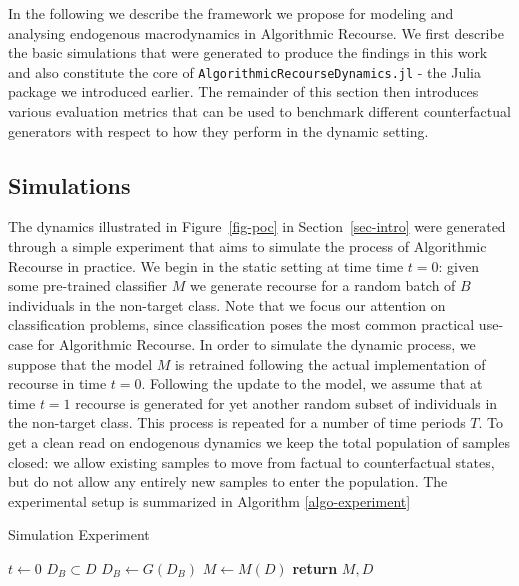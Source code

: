 \documentclass[
  conference]{IEEEtran}
\begin{document}
In the following we describe the framework we propose for modeling and
analysing endogenous macrodynamics in Algorithmic Recourse. We first
describe the basic simulations that were generated to produce the
findings in this work and also constitute the core of
\texttt{AlgorithmicRecourseDynamics.jl} - the Julia package we
introduced earlier. The remainder of this section then introduces
various evaluation metrics that can be used to benchmark different
counterfactual generators with respect to how they perform in the
dynamic setting.

\hypertarget{sec-method-2-experiment}{%
\subsection{Simulations}\label{sec-method-2-experiment}}

The dynamics illustrated in Figure~\ref{fig-poc} in
Section~\ref{sec-intro} were generated through a simple experiment that
aims to simulate the process of Algorithmic Recourse in practice. We
begin in the static setting at time time \(t=0\): given some pre-trained
classifier \(M\) we generate recourse for a random batch of \(B\)
individuals in the non-target class. Note that we focus our attention on
classification problems, since classification poses the most common
practical use-case for Algorithmic Recourse. In order to simulate the
dynamic process, we suppose that the model \(M\) is retrained following
the actual implementation of recourse in time \(t=0\). Following the
update to the model, we assume that at time \(t=1\) recourse is
generated for yet another random subset of individuals in the non-target
class. This process is repeated for a number of time periods \(T\). To
get a clean read on endogenous dynamics we keep the total population of
samples closed: we allow existing samples to move from factual to
counterfactual states, but do not allow any entirely new samples to
enter the population. The experimental setup is summarized in Algorithm
\ref{algo-experiment}

\begin{algorithm}
\caption{Simulation Experiment}\label{algo-experiment}
\begin{algorithmic}[1]
\State $t\gets 0$
\State $D_B \subset D$
\State $D_B\gets G(D_B)$ 
\State $M\gets M(D)$ 
\EndWhile
\State \textbf{return} $M,D$
\EndProcedure
\end{algorithmic}
\end{algorithm}
\end{document}
